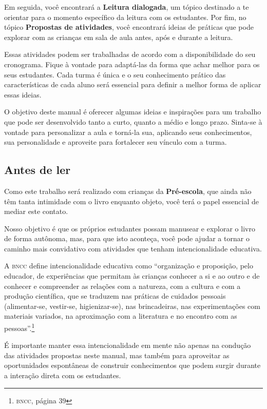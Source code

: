 \documentclass[11pt]{extarticle}
\begin{document}
Em seguida, você encontrará a \textbf{Leitura dialogada}, um 
tópico destinado a te orientar para o momento específico da 
leitura com os estudantes. Por fim, no tópico 
\textbf{Propostas de atividades}, você encontrará ideias 
de práticas que pode explorar com as crianças em sala de 
aula antes, após e durante a leitura. 

Essas atividades podem ser trabalhadas de acordo com a 
disponibilidade do seu cronograma. Fique à vontade para adaptá-las 
da forma que achar melhor para os seus estudantes. Cada turma é única 
e o seu conhecimento prático das características de cada aluno será 
essencial para definir a melhor forma de aplicar essas ideias. 

O objetivo deste manual é oferecer algumas ideias 
e inspirações para um trabalho que pode ser desenvolvido tanto 
a curto, quanto a médio e longo prazo. Sinta-se à vontade para 
personalizar a aula e torná-la sua, aplicando seus conhecimentos, sua 
personalidade e aproveite para fortalecer 
seu vínculo com a turma.


\subsection{Antes de ler}



Como este trabalho será realizado com crianças da \textbf{Pré-escola}, 
que ainda não têm tanta intimidade com o livro enquanto objeto, você terá o 
papel essencial de mediar este contato. 

Nosso objetivo é que os próprios estudantes possam manusear 
e explorar o livro de forma autônoma, mas, para que isto aconteça, você 
pode ajudar a tornar o caminho mais convidativo com atividades que tenham 
intencionalidade educativa. 

A \textsc{bncc} define intencionalidade educativa como ``organização 
e proposição, pelo educador, de experiências que permitam às crianças 
conhecer a si e ao outro e de conhecer e compreender as relações com a 
natureza, com a cultura e com a produção científica, que se traduzem nas 
práticas de cuidados pessoais (alimentar-se, vestir-se, higienizar-se), 
nas brincadeiras, nas experimentações com materiais 
variados, na aproximação com a literatura e no encontro com as 
pessoas''.\footnote{\textsc{bncc}, página 39}

É importante manter essa intencionalidade em mente não apenas na condução 
das atividades propostas neste manual, mas também para aproveitar as 
oportunidades espontâneas de construir conhecimentos que podem surgir durante 
a interação direta com os estudantes.
\end{document}
